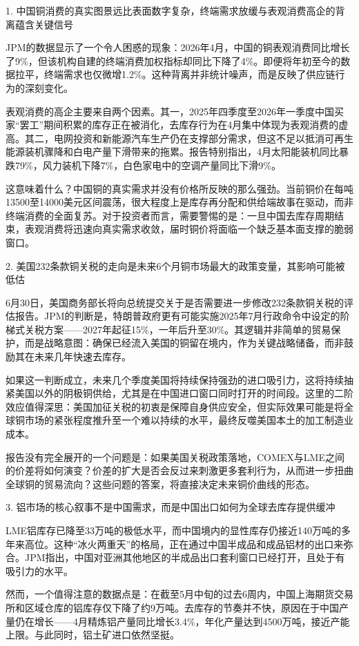 \documentclass[11pt]{ctexart}
\begin{document}
1. 中国铜消费的真实图景远比表面数字复杂，终端需求放缓与表观消费高企的背离蕴含关键信号

JPM的数据显示了一个令人困惑的现象：2026年4月，中国的铜表观消费同比增长了9\%，但该机构自建的终端消费加权指标却同比下降了4\%。即便将年初至今的数据拉平，终端需求也仅微增1.2\%。这种背离并非统计噪声，而是反映了供应链行为的深刻变化。

表观消费的高企主要来自两个因素。其一，2025年四季度至2026年一季度中国买家“罢工”期间积累的库存正在被消化，去库存行为在4月集中体现为表观消费的虚高。其二，电网投资和新能源汽车生产仍在支撑部分需求，但这不足以抵消可再生能源装机骤降和白电产量下滑带来的拖累。报告特别指出，4月太阳能装机同比暴跌79\%，风力装机下降7\%，白色家电中的空调产量同比下滑9\%。

这意味着什么？中国铜的真实需求并没有价格所反映的那么强劲。当前铜价在每吨13500至14000美元区间震荡，很大程度上是库存再分配和供给端故事在驱动，而非终端消费的全面复苏。对于投资者而言，需要警惕的是：一旦中国去库存周期结束，表观消费将迅速向真实需求收敛，届时铜价将面临一个缺乏基本面支撑的脆弱窗口。

2. 美国232条款铜关税的走向是未来6个月铜市场最大的政策变量，其影响可能被低估

6月30日，美国商务部长将向总统提交关于是否需要进一步修改232条款铜关税的评估报告。JPM的判断是，特朗普政府更有可能实施2025年7月行政命令中设定的阶梯式关税方案——2027年起征15\%，一年后升至30\%。其逻辑并非简单的贸易保护，而是战略意图：确保已经流入美国的铜留在境内，作为关键战略储备，而非鼓励其在未来几年快速去库存。

如果这一判断成立，未来几个季度美国将持续保持强劲的进口吸引力，这将持续抽紧美国以外的阴极铜供给，尤其是在中国进口窗口同时打开的时间段。这里的二阶效应值得深思：美国加征关税的初衷是保障自身供应安全，但实际效果可能是将全球铜市场的紧张程度推升至一个难以持续的水平，最终反噬美国本土的加工制造业成本。

报告没有完全展开的一个问题是：如果美国关税政策落地，COMEX与LME之间的价差将如何演变？价差的扩大是否会反过来刺激更多套利行为，从而进一步扭曲全球铜的贸易流向？这些问题的答案，将直接决定未来铜价曲线的形态。

3. 铝市场的核心叙事不是中国需求，而是中国出口如何为全球去库存提供缓冲

LME铝库存已降至33万吨的极低水平，而中国境内的显性库存仍接近140万吨的多年来高位。这种“冰火两重天”的格局，正在通过中国半成品和成品铝材的出口来弥合。JPM指出，中国对亚洲其他地区的半成品出口套利窗口已经打开，且处于有吸引力的水平。

然而，一个值得注意的数据点是：在截至5月中旬的过去6周内，中国上海期货交易所和区域仓库的铝库存仅下降了约9万吨。去库存的节奏并不快，原因在于中国产量仍在增长——4月精炼铝产量同比增长3.4\%，年化产量达到4500万吨，接近产能上限。与此同时，铝土矿进口依然坚挺。
\end{document}
